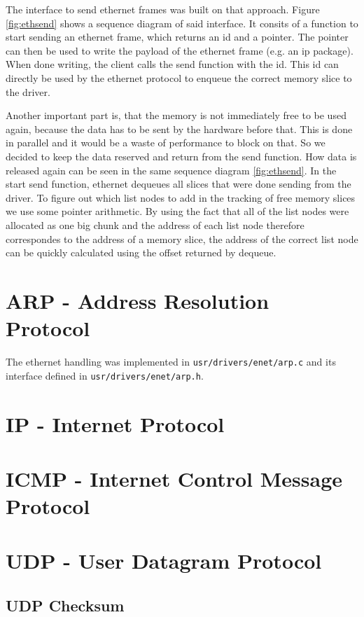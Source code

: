 The interface to send ethernet frames was built on that approach. Figure \ref{fig:ethsend} shows a sequence diagram of said interface. It consits of a function to start sending an ethernet frame, which returns an id and a pointer. The pointer can then be used to write the payload of the ethernet frame (e.g. an ip package). When done writing, the client calls the send function with the id. This id can directly be used by the ethernet protocol to enqueue the correct memory slice to the driver.

Another important part is, that the memory is not immediately free to be used again, because the data has to be sent by the hardware before that. This is done in parallel and it would be a waste of performance to block on that. So we decided to keep the data reserved and return from the send function. How data is released again can be seen in the same sequence diagram \ref{fig:ethsend}. In the start send function, ethernet dequeues all slices that were done sending from the driver. To figure out which list nodes to add in the tracking of free memory slices we use some pointer arithmetic. By using the fact that all of the list nodes were allocated as one big chunk and the address of each list node therefore correspondes to the address of a memory slice, the address of the correct list node can be quickly calculated using the offset returned by dequeue.

\section{ARP - Address Resolution Protocol}
The ethernet handling was implemented in \verb|usr/drivers/enet/arp.c| and its interface defined in \verb|usr/drivers/enet/arp.h|.


\section{IP - Internet Protocol}

\section{ICMP - Internet Control Message Protocol}

\section{UDP - User Datagram Protocol}

\subsection{UDP Checksum}

